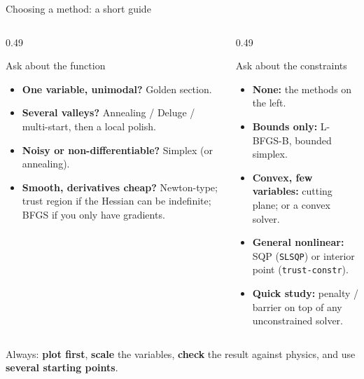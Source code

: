 \documentclass[aspectratio=169,10pt]{beamer}
\begin{document}
\begin{frame}{Choosing a method: a short guide}
  \begin{columns}[T]
    \begin{column}{0.49\textwidth}
      \begin{block}{Ask about the function}
        \small
        \begin{itemize}
          \item \textbf{One variable, unimodal?} Golden section.
          \item \textbf{Several valleys?} Annealing / Deluge / multi-start, then a local polish.
          \item \textbf{Noisy or non-differentiable?} Simplex (or annealing).
          \item \textbf{Smooth, derivatives cheap?} Newton-type; trust region if the Hessian can be indefinite; BFGS if you only have gradients.
        \end{itemize}
      \end{block}
    \end{column}
    \begin{column}{0.49\textwidth}
      \begin{block}{Ask about the constraints}
        \small
        \begin{itemize}
          \item \textbf{None:} the methods on the left.
          \item \textbf{Bounds only:} L-BFGS-B, bounded simplex.
          \item \textbf{Convex, few variables:} cutting plane; or a convex solver.
          \item \textbf{General nonlinear:} SQP (\texttt{SLSQP}) or interior point (\texttt{trust-constr}).
          \item \textbf{Quick study:} penalty / barrier on top of any unconstrained solver.
        \end{itemize}
      \end{block}
    \end{column}
  \end{columns}
  \vspace{0.1cm}
  \centering\small Always: \textbf{plot first}, \textbf{scale} the variables, \textbf{check} the result against physics, and use \textbf{several starting points}.
\end{frame}
\end{document}
